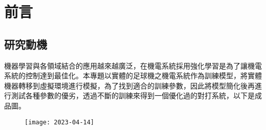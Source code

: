 \chapter{前言}
\renewcommand{\baselinestretch}{10.0} %
\setcounter{page}{1}  %
\fontsize{14pt}{2.5pt}\sectionef
\section{研究動機}
機器學習與各領域結合的應用越來越廣泛，在機電系統採用強化學習是為了讓機電系統的控制達到最佳化。本專題以實體的足球機之機電系統作為訓練模型，將實體機器轉移到虛擬環境進行模擬，為了找到適合的訓練參數，因此將模型簡化後再進行測試各種參數的優劣，透過不斷的訓練來得到一個優化過的對打系統，以下是成品圖。\\

\begin{figure}[hbt!]
\begin{center}
\texttt{[image: 2023-04-14]}
\end{center}
\end{figure}
